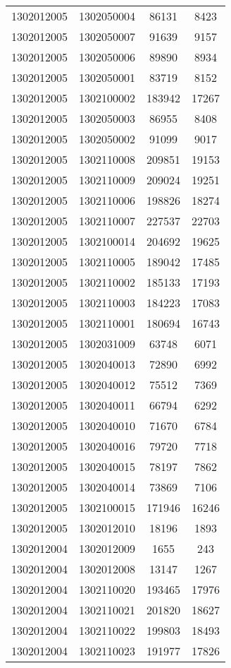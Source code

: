\begin{longtable}[h]{llcc}
		1302012005 & 1302050004 & 86131 & 8423\\
		1302012005 & 1302050007 & 91639 & 9157\\
		1302012005 & 1302050006 & 89890 & 8934\\
		1302012005 & 1302050001 & 83719 & 8152\\
		1302012005 & 1302100002 & 183942 & 17267\\
		1302012005 & 1302050003 & 86955 & 8408\\
		1302012005 & 1302050002 & 91099 & 9017\\
		1302012005 & 1302110008 & 209851 & 19153\\
		1302012005 & 1302110009 & 209024 & 19251\\
		1302012005 & 1302110006 & 198826 & 18274\\
		1302012005 & 1302110007 & 227537 & 22703\\
		1302012005 & 1302100014 & 204692 & 19625\\
		1302012005 & 1302110005 & 189042 & 17485\\
		1302012005 & 1302110002 & 185133 & 17193\\
		1302012005 & 1302110003 & 184223 & 17083\\
		1302012005 & 1302110001 & 180694 & 16743\\
		1302012005 & 1302031009 & 63748 & 6071\\
		1302012005 & 1302040013 & 72890 & 6992\\
		1302012005 & 1302040012 & 75512 & 7369\\
		1302012005 & 1302040011 & 66794 & 6292\\
		1302012005 & 1302040010 & 71670 & 6784\\
		1302012005 & 1302040016 & 79720 & 7718\\
		1302012005 & 1302040015 & 78197 & 7862\\
		1302012005 & 1302040014 & 73869 & 7106\\
		1302012005 & 1302100015 & 171946 & 16246\\
		1302012005 & 1302012010 & 18196 & 1893\\
		1302012004 & 1302012009 & 1655 & 243\\
		1302012004 & 1302012008 & 13147 & 1267\\
		1302012004 & 1302110020 & 193465 & 17976\\
		1302012004 & 1302110021 & 201820 & 18627\\
		1302012004 & 1302110022 & 199803 & 18493\\
		1302012004 & 1302110023 & 191977 & 17826\\

\end{longtable}
